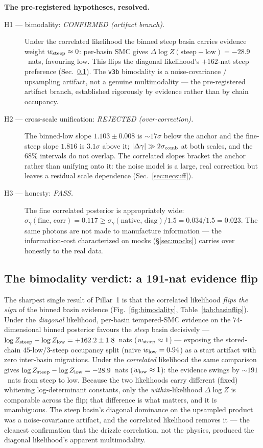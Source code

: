 \documentclass[11pt,letterpaper]{article}
\newcommand{\gammaEPL}{\ensuremath{\gamma}}
\newcommand{\dfile}[1]{\texttt{#1}}
\begin{document}
\medskip\noindent\textbf{The pre-registered hypotheses, resolved.}
\begin{description}
\item[H1 --- bimodality: {\itshape\color{black} CONFIRMED (artifact branch).}]
Under the correlated likelihood the binned steep basin carries evidence weight
$w_{\rm steep}\approx0$: per-basin SMC gives $\Delta\log Z(\text{steep}-\text{low})
=-28.9$~nats, favouring low. This flips the diagonal likelihood's
$+162$-nat steep preference (Sec.~\ref{sec:basinflip}). The \dfile{v3b}
bimodality is a noise-covariance / upsampling artifact, not a genuine
multimodality --- the pre-registered artifact branch, established rigorously by
evidence rather than by chain occupancy.
\item[H2 --- cross-scale unification: {\itshape\color{black} REJECTED
(over-correction).}] The binned-low slope $1.103\pm0.008$ is $\sim$$17\sigma$
below the anchor and the fine-steep slope $1.816$ is $3.1\sigma$ above it;
$|\Delta\gammaEPL|\gg2\sigma_{\rm comb}$ at both scales, and the $68\%$ intervals
do not overlap. The correlated slopes bracket the anchor rather than unifying
onto it: the noise model is a large, real correction but leaves a residual
scale dependence (Sec.~\ref{sec:necsuff}).
\item[H3 --- honesty: {\itshape\color{black} PASS.}] The fine correlated
posterior is appropriately wide: $\sigma_\gamma(\text{fine, corr})=0.117\ge
\sigma_\gamma(\text{native, diag})/1.5=0.034/1.5=0.023$. The same photons are
not made to manufacture information --- the information-cost characterized on
mocks (\S\ref{sec:mocks}) carries over honestly to the real data.
\end{description}

\subsection{The bimodality verdict: a 191-nat evidence flip}
\label{sec:basinflip}

The sharpest single result of Pillar~1 is that the correlated likelihood {\it
flips the sign} of the binned basin evidence (Fig.~\ref{fig:bimodality},
Table~\ref{tab:basinflip}). Under the {\it diagonal} likelihood, per-basin
tempered-SMC evidence on the $74$-dimensional binned posterior favours the
{\it steep} basin decisively --- $\log Z_{\rm steep}-\log Z_{\rm low}
=+162.2\pm1.8$~nats ($w_{\rm steep}\approx1$) --- exposing the stored-chain
$45$-low/$3$-steep occupancy split (naive $w_{\rm low}=0.94$) as a start
artifact with zero inter-basin migrations. Under the {\it correlated}
likelihood the same comparison gives $\log Z_{\rm steep}-\log Z_{\rm low}
=-28.9$~nats ($w_{\rm low}\approx1$): the evidence swings by $\sim$$191$~nats
from steep to low. Because the two likelihoods carry different (fixed) whitening
log-determinant constants, only the {\it within}-likelihood $\Delta\log Z$ is
comparable across the flip; that difference is what matters, and it is
unambiguous. The steep basin's diagonal dominance on the upsampled product was a
noise-covariance artifact, and the correlated likelihood removes it --- the
cleanest confirmation that the drizzle correlation, not the physics, produced
the diagonal likelihood's apparent multimodality.
\end{document}
